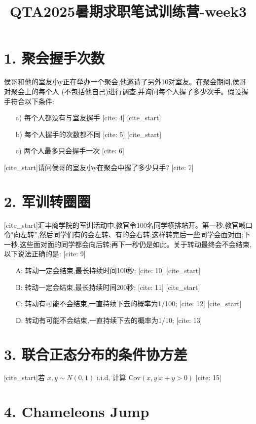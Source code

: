 \documentclass[UTF8]{ctexart}
\title{QTA2025暑期求职笔试训练营-week3}
\author{}
\date{}
\begin{document}
\maketitle

\section*{1. 聚会握手次数}

侯哥和他的室友小y正在举办一个聚会,他邀请了另外10对室友。在聚会期间,侯哥对聚会上的每个人 (不包括他自己)进行调查,并询问每个人握了多少次手。假设握手符合以下条件:
\begin{itemize}
    [cite_start]\item[a)] 每个人都没有与室友握手 [cite: 4]
    [cite_start]\item[b)] 每个人握手的次数都不同 [cite: 5]
    [cite_start]\item[c)] 两个人最多只会握手一次 [cite: 6]
\end{itemize}
[cite_start]请问侯哥的室友小y在聚会中握了多少只手? [cite: 7]

\section*{2. 军训转圈圈}

[cite_start]汇丰商学院的军训活动中,教官令100名同学横排站开。第一秒,教官喊口令"向左转”,然后同学们有的会左转、有的会右转,这样转完后一些同学会面对面;下一秒,这些面对面的同学都会向后转;再下一秒仍是如此。关于转动最终会不会结束,以下说法正确的是: [cite: 9]
\begin{itemize}
    [cite_start]\item[A:] 转动一定会结束,最长持续时间100秒; [cite: 10]
    [cite_start]\item[B:] 转动一定会结束,最长持续时间200秒; [cite: 11]
    [cite_start]\item[C:] 转动有可能不会结束,一直持续下去的概率为1/100; [cite: 12]
    [cite_start]\item[D:] 转动有可能不会结束,一直持续下去的概率为1/10; [cite: 13]
\end{itemize}

\section*{3. 联合正态分布的条件协方差}

[cite_start]若 $x, y \sim N(0,1)$ i.i.d, 计算 $\text{Cov}(x, y | x+y > 0)$ [cite: 15]

\section*{4. Chameleons Jump}
\end{document}
